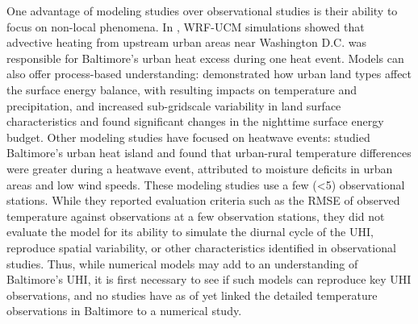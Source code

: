\documentclass[draft,linenumbers]{agujournal}
\begin{document}
One advantage of 
modeling studies over observational studies is their ability to focus on non-local phenomena.
In
\cite{zhang2011impact}, WRF-UCM simulations showed that advective heating from upstream urban areas near Washington D.C. was responsible for Baltimore's urban heat excess during one heat event. 
Models can also offer process-based understanding: \cite{li2013modeling} demonstrated how urban land types affect the surface energy balance, with resulting impacts on temperature and precipitation, and \cite{li2013development} increased sub-gridscale variability in land surface characteristics and found significant changes in the nighttime surface energy budget. 
Other modeling studies have focused on heatwave events: \cite{li2013synergistic} studied Baltimore's urban heat island and found that urban-rural temperature differences were greater during a heatwave event, attributed to moisture deficits in urban areas and low wind speeds. 
These modeling studies use a few (<5) observational stations. While they reported evaluation criteria such as the RMSE of observed temperature against observations at a few observation stations, they did not evaluate the model for its ability to simulate the diurnal cycle of the UHI, reproduce spatial variability, or other characteristics identified in observational studies. Thus, while numerical models may add to an understanding of Baltimore's UHI, it is first necessary to see if such models can reproduce key UHI observations, and no studies have as of yet linked the detailed temperature observations in Baltimore to a numerical study. 

\end{document}
